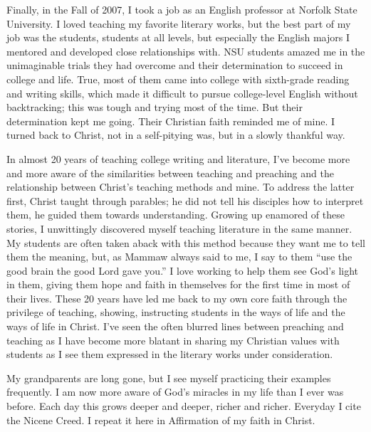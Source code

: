 \documentclass{article}
\begin{document}
Finally, in the Fall of 2007, I took a job as an English professor at Norfolk State University. 
I loved teaching my favorite literary works, but the best part of my job was the students, students at all levels, but especially the English majors I mentored and developed close relationships with. 
NSU students amazed me in the unimaginable trials they had overcome and their determination to succeed in college and life. 
True, most of them came into college with sixth-grade reading and writing skills, which made it difficult to pursue college-level English without backtracking; this was tough and trying most of the time. 
But their determination kept me going. 
Their Christian faith reminded me of mine. 
I turned back to Christ, not in a self-pitying was, but in a slowly thankful way.
 
In almost 20 years of teaching college writing and literature, I've become more and more aware of the similarities between teaching and preaching and the relationship between Christ's teaching methods and mine. 
To address the latter first, Christ taught through parables; he did not tell his disciples how to interpret them, he guided them towards understanding. 
Growing up enamored of these stories, I unwittingly discovered myself teaching literature in the same manner. 
My students are often taken aback with this method because they want me to tell them the meaning, but, as Mammaw always said to me, I say to them ``use the good brain the good Lord gave you.'' 
I love working to help them see God's light in them, giving them hope and faith in themselves for the first time in most of their lives. 
These 20 years have led me back to my own core faith through the privilege of teaching, showing, instructing students in the ways of life and the ways of life in Christ. 
I've seen the often blurred lines between preaching and teaching as I have become more blatant in sharing my Christian values with students as I see them expressed in the literary works under consideration. 
	
My grandparents are long gone, but I see myself practicing their examples frequently. 
I am now more aware of God's miracles in my life than I ever was before. 
Each day this grows deeper and deeper, richer and richer. 
Everyday I cite the Nicene Creed. 
I repeat it here in Affirmation of my faith in Christ.
\end{document}
